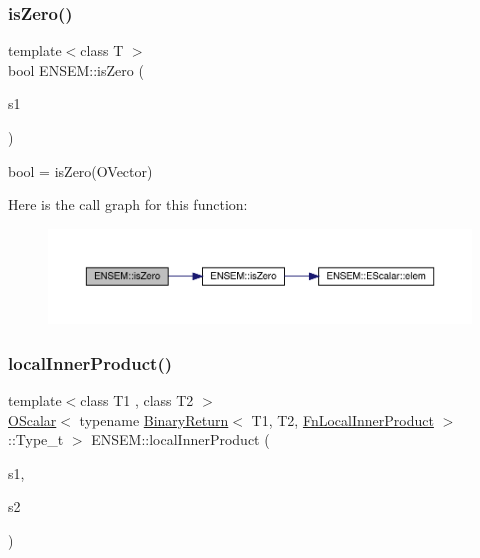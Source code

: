 \subsubsection{\texorpdfstring{isZero()}{isZero()}}
{\footnotesize\ttfamily template$<$class T $>$ \\
bool E\+N\+S\+E\+M\+::is\+Zero (\begin{DoxyParamCaption}\item[{const \mbox{\hyperlink{classENSEM_1_1OVector}{O\+Vector}}$<$ T $>$ \&}]{s1 }\end{DoxyParamCaption})}



bool = is\+Zero(\+O\+Vector) 

Here is the call graph for this function\+:\nopagebreak
\begin{figure}[H]
\begin{center}
\leavevmode
\includegraphics[width=350pt]{da/d59/group__obsvector_gaba334c166dc76f5d8390574d1ea1a936_cgraph}
\end{center}
\end{figure}
\mbox{\label{group__obsvector_gad915d71f08c700574f01f93a9689eb82}} 
\subsubsection{\texorpdfstring{localInnerProduct()}{localInnerProduct()}}
{\footnotesize\ttfamily template$<$class T1 , class T2 $>$ \\
\mbox{\hyperlink{classENSEM_1_1OScalar}{O\+Scalar}}$<$ typename \mbox{\hyperlink{structENSEM_1_1BinaryReturn}{Binary\+Return}}$<$ T1, T2, \mbox{\hyperlink{structENSEM_1_1FnLocalInnerProduct}{Fn\+Local\+Inner\+Product}} $>$\+::Type\+\_\+t $>$ E\+N\+S\+E\+M\+::local\+Inner\+Product (\begin{DoxyParamCaption}\item[{const \mbox{\hyperlink{classENSEM_1_1OVector}{O\+Vector}}$<$ T1 $>$ \&}]{s1,  }\item[{const \mbox{\hyperlink{classENSEM_1_1OVector}{O\+Vector}}$<$ T2 $>$ \&}]{s2 }\end{DoxyParamCaption})\hspace{0.3cm}{\ttfamily [inline]}}

